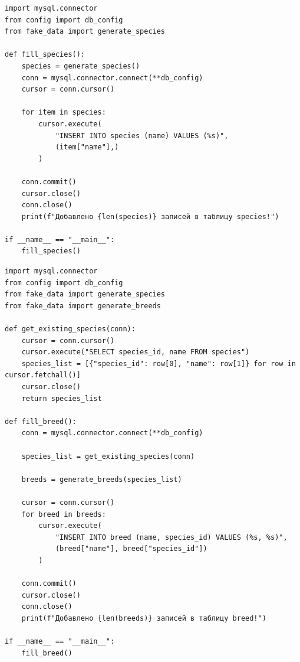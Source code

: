 \documentclass[a4paper]{article}
\begin{document}
\begin{lstlisting}[caption = Заполнение таблицы Species, basicstyle= \scriptsize \ttfamily]
import mysql.connector
from config import db_config
from fake_data import generate_species

def fill_species():
    species = generate_species() 
    conn = mysql.connector.connect(**db_config)
    cursor = conn.cursor()

    for item in species:
        cursor.execute(
            "INSERT INTO species (name) VALUES (%s)",
            (item["name"],)
        )
    
    conn.commit()
    cursor.close()
    conn.close()
    print(f"Добавлено {len(species)} записей в таблицу species!")

if __name__ == "__main__":
    fill_species()
\end{lstlisting}

\begin{lstlisting}[caption = Заполнение таблицы Breed, basicstyle= \scriptsize \ttfamily]
import mysql.connector
from config import db_config
from fake_data import generate_species
from fake_data import generate_breeds

def get_existing_species(conn):
    cursor = conn.cursor()
    cursor.execute("SELECT species_id, name FROM species")
    species_list = [{"species_id": row[0], "name": row[1]} for row in cursor.fetchall()]
    cursor.close()
    return species_list

def fill_breed():
    conn = mysql.connector.connect(**db_config)

    species_list = get_existing_species(conn)

    breeds = generate_breeds(species_list)

    cursor = conn.cursor()
    for breed in breeds:
        cursor.execute(
            "INSERT INTO breed (name, species_id) VALUES (%s, %s)",
            (breed["name"], breed["species_id"])
        )
    
    conn.commit()
    cursor.close()
    conn.close()
    print(f"Добавлено {len(breeds)} записей в таблицу breed!")

if __name__ == "__main__":
    fill_breed()
\end{lstlisting}
\end{document}
